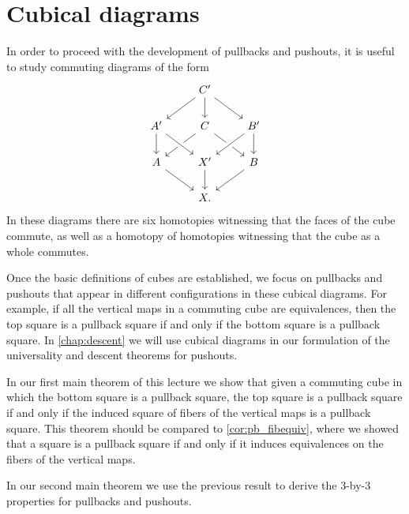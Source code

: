 \section{Cubical diagrams}

In order to proceed with the development of pullbacks and pushouts, it is useful to study commuting diagrams of the form
\begin{equation*}
  \begin{tikzcd}
    & C' \arrow[dl] \arrow[d] \arrow[dr] \\
    A' \arrow[d] & C \arrow[dl] \arrow[dr] & B' \arrow[dl,crossing over] \arrow[d] \\
    A \arrow[dr] & X' \arrow[from=ul,crossing over] \arrow[d] & B \arrow[dl] \\
    & X.
  \end{tikzcd}
\end{equation*}
In these diagrams there are six homotopies witnessing that the faces of the cube commute, as well as a homotopy of homotopies witnessing that the cube as a whole commutes.

Once the basic definitions of cubes are established, we focus on pullbacks and pushouts that appear in different configurations in these cubical diagrams. For example, if all the vertical maps in a commuting cube are equivalences, then the top square is a pullback square if and only if the bottom square is a pullback square. In \cref{chap:descent} we will use cubical diagrams in our formulation of the universality and descent theorems for pushouts.

In our first main theorem of this lecture we show that given a commuting cube in which the bottom square is a pullback square, the top square is a pullback square if and only if the induced square of fibers of the vertical maps is a pullback square. This theorem should be compared to \cref{cor:pb_fibequiv}, where we showed that a square is a pullback square if and only if it induces equivalences on the fibers of the vertical maps.

In our second main theorem we use the previous result to derive the 3-by-3 properties for pullbacks and pushouts.


